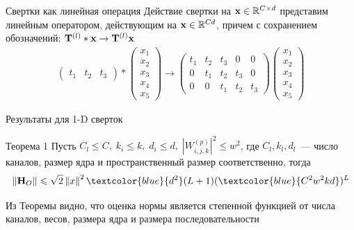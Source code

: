 \documentclass[aspectratio=169]{beamer}
\begin{document}
\begin{frame}{Свертки как линейная операция}
    Действие свертки на $\mathbf{x} \in \mathbb{R}^{C\times d}$ представим линейным оператором, действующим на $\mathbf{x} \in \mathbb{R}^{Cd}$, причем с сохранением обозначений\;\;: $\mathbf{T}^{(l)}*\mathbf{x} \rightarrow \mathbf{T}^{(l)}\mathbf{x}$ \\
    \begin{align*}
        \begin{pmatrix}
            t_1 & t_2 & t_3
        \end{pmatrix}*
        \begin{pmatrix}
            x_1 \\
            x_2 \\
            x_3 \\
            x_4 \\
            x_5
        \end{pmatrix} \rightarrow
        \begin{pmatrix}
            t_1 & t_2 & t_3 & 0 & 0 \\
            0 & t_1 & t_2 & t_3 & 0 \\
            0 & 0 & t_1 & t_2 & t_3 
        \end{pmatrix}
        \begin{pmatrix}
            x_1 \\
            x_2 \\
            x_3 \\
            x_4 \\
            x_5
        \end{pmatrix}
    \end{align*}
\end{frame}

\begin{frame}{Результаты для 1-D сверток}
\begin{block}{Теорема 1}
    Пусть $C_l \leqslant C,\; k_i \leqslant k, \; d_i \leqslant d, \; |W_{i,j,k}^{(p)}|^2 \leqslant w^2$, где $C_l, k_l, d_l$~--- число каналов, размер ядра и пространственный размер соответственно, тогда \\
    \[\norm{\bH_O} \leqslant \sqrt{2}\norm{x}^2\textcolor{blue}{d^2}(L+1)(\textcolor{blue}{C^2w^2kd})^L\]
\end{block}
Из Теоремы видно, что оценка нормы является степенной функцией от числа каналов, весов, размера ядра и размера последовательности
\end{frame}
\end{document}
